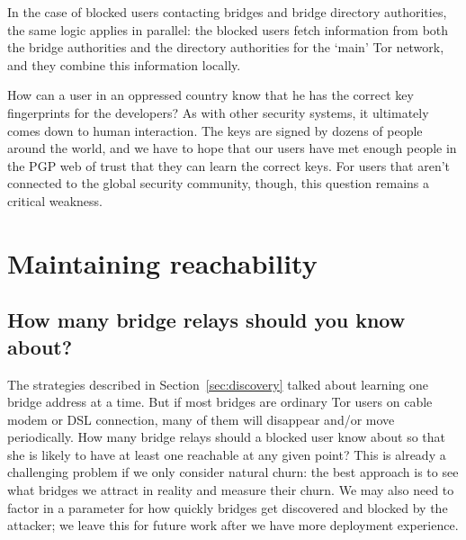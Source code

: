 \documentclass{llncs}
\begin{document}
In the case of blocked users contacting bridges and bridge directory
authorities, the same logic applies in parallel: the blocked users fetch
information from both the bridge authorities and the directory authorities
for the `main' Tor network, and they combine this information locally.

How can a user in an oppressed country know that he has the correct
key fingerprints for the developers? As with other security systems, it
ultimately comes down to human interaction. The keys are signed by dozens
of people around the world, and we have to hope that our users have met
enough people in the PGP web of trust
that they can learn
the correct keys. For users that aren't connected to the global security
community, though, this question remains a critical weakness.



%
%
%
%

\section{Maintaining reachability}

\subsection{How many bridge relays should you know about?}

The strategies described in Section~\ref{sec:discovery} talked about
learning one bridge address at a time. But if most bridges are ordinary
Tor users on cable modem or DSL connection, many of them will disappear
and/or move periodically. How many bridge relays should a blocked user
know about so that she is likely to have at least one reachable at any
given point? This is already a challenging problem if we only consider
natural churn: the best approach is to see what bridges we attract in
reality and measure their churn. We may also need to factor in a parameter
for how quickly bridges get discovered and blocked by the attacker;
we leave this for future work after we have more deployment experience.
\end{document}
